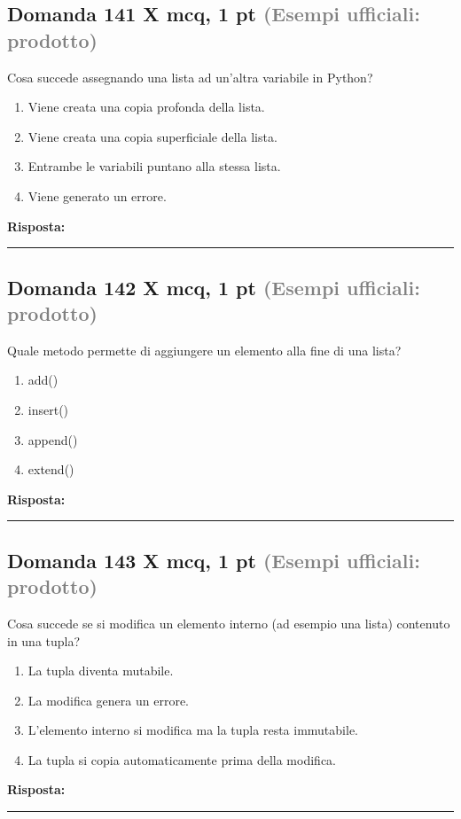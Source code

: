 \documentclass[a4paper,11pt]{article}
\begin{document}
\subsection*{Domanda 141 X \hfill {\small mcq, 1 pt \textcolor{gray}{(Esempi ufficiali: prodotto)}}}
Cosa succede assegnando una lista ad un'altra variabile in Python?

\begin{enumerate}[label=\alph*)]
\item Viene creata una copia profonda della lista.
\item Viene creata una copia superficiale della lista.
\item Entrambe le variabili puntano alla stessa lista.
\item Viene generato un errore.
\end{enumerate}
\vspace{0.2cm}
\noindent\textbf{Risposta:}\par
\vspace{1.5cm}\hrule


\subsection*{Domanda 142 X \hfill {\small mcq, 1 pt \textcolor{gray}{(Esempi ufficiali: prodotto)}}}
Quale metodo permette di aggiungere un elemento alla fine di una lista?

\begin{enumerate}[label=\alph*)]
\item add()
\item insert()
\item append()
\item extend()
\end{enumerate}
\vspace{0.2cm}
\noindent\textbf{Risposta:}\par
\vspace{1.5cm}\hrule


\subsection*{Domanda 143 X \hfill {\small mcq, 1 pt \textcolor{gray}{(Esempi ufficiali: prodotto)}}}
Cosa succede se si modifica un elemento interno (ad esempio una lista) contenuto in una tupla?

\begin{enumerate}[label=\alph*)]
\item La tupla diventa mutabile.
\item La modifica genera un errore.
\item L'elemento interno si modifica ma la tupla resta immutabile.
\item La tupla si copia automaticamente prima della modifica.
\end{enumerate}
\vspace{0.2cm}
\noindent\textbf{Risposta:}\par
\vspace{1.5cm}\hrule
\end{document}
